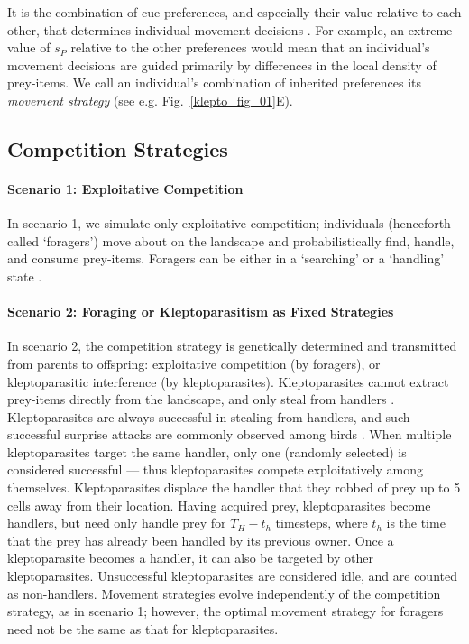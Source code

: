 It is the combination of cue preferences, and especially their value relative to each other, that determines individual movement decisions \citep[similar to relative selection coefficients,][]{fortin2005,avgar2016,white2018}. 
For example, an extreme value of $s_P$ relative to the other preferences would mean that an individual's movement decisions are guided primarily by differences in the local density of prey-items.
We call an individual's combination of inherited preferences its \textit{movement strategy} (see e.g. Fig.~\ref{klepto_fig_01}E).

\subsection*{Competition Strategies}

\paragraph{Scenario 1: Exploitative Competition}

In scenario 1, we simulate only exploitative competition; individuals (henceforth called `foragers') move about on the landscape and probabilistically find, handle, and consume prey-items.
Foragers can be either in a `searching' or a `handling' state \citep{holmgren1995}.

\paragraph{Scenario 2: Foraging or Kleptoparasitism as Fixed Strategies}

In scenario 2, the competition strategy is genetically determined and transmitted from parents to offspring: exploitative competition (by foragers), or kleptoparasitic interference (by kleptoparasites).
Kleptoparasites cannot extract prey-items directly from the landscape, and only steal from handlers \citep[see][]{holmgren1995}.
Kleptoparasites are always successful in stealing from handlers, and such successful surprise attacks are commonly observed among birds \citep{brockmann1979}.
When multiple kleptoparasites target the same handler, only one (randomly selected) is considered successful --- thus kleptoparasites compete exploitatively among themselves.
Kleptoparasites displace the handler that they robbed of prey up to 5 cells away from their location.
Having acquired prey, kleptoparasites become handlers, but need only handle prey for $T_H - t_h$ timesteps, where $t_h$ is the time that the prey has already been handled by its previous owner.
Once a kleptoparasite becomes a handler, it can also be targeted by other kleptoparasites.
Unsuccessful kleptoparasites are considered idle, and are counted as non-handlers.
Movement strategies evolve independently of the competition strategy, as in scenario 1; however, the optimal movement strategy for foragers need not be the same as that for kleptoparasites.

